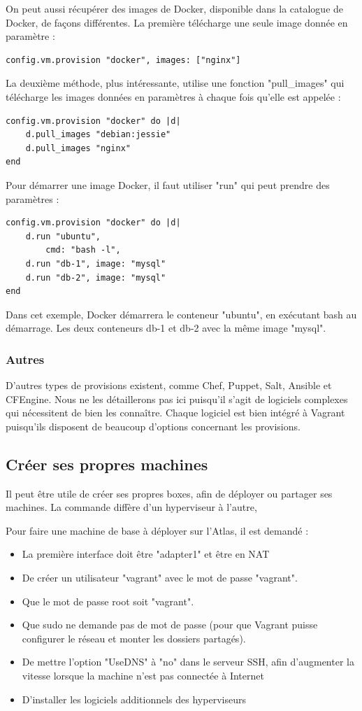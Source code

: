 \documentclass[12pt,a4paper]{article}
\begin{document}
On peut aussi récupérer des images de Docker, disponible dans la catalogue de Docker, de façons différentes. La première télécharge une seule image donnée en paramètre :
\begin{lstlisting}
config.vm.provision "docker", images: ["nginx"]
\end{lstlisting}
La deuxième méthode, plus intéressante, utilise une fonction "pull\_images" qui télécharge les images données en paramètres à chaque fois qu'elle est appelée : 
\begin{lstlisting}
config.vm.provision "docker" do |d|
	d.pull_images "debian:jessie"
	d.pull_images "nginx"
end
\end{lstlisting}

Pour démarrer une image Docker, il faut utiliser "run" qui peut prendre des paramètres :
\begin{lstlisting}
config.vm.provision "docker" do |d|
	d.run "ubuntu",
		cmd: "bash -l",
	d.run "db-1", image: "mysql"
	d.run "db-2", image: "mysql"
end
\end{lstlisting}
Dans cet exemple, Docker démarrera le conteneur "ubuntu", en exécutant bash au démarrage. Les deux conteneurs db-1 et db-2 avec la même image "mysql".

\subsubsection{Autres}

D'autres types de provisions existent, comme Chef, Puppet, Salt, Ansible et CFEngine. Nous ne les détaillerons pas ici puisqu'il s'agit de logiciels complexes qui nécessitent de bien les connaître. Chaque logiciel est bien intégré à Vagrant puisqu'ils disposent de beaucoup d'options concernant les provisions.

\subsection{Créer ses propres machines}
Il peut être utile de créer ses propres boxes, afin de déployer ou partager ses machines. La commande diffère d'un hyperviseur à l'autre, 

Pour faire une machine de base à déployer sur l'Atlas, il est demandé :
\begin{itemize}
	\item{La première interface doit être "adapter1" et être en NAT}
	\item{De créer un utilisateur "vagrant" avec le mot de passe "vagrant".}
	\item{Que le mot de passe root soit "vagrant".}
	\item{Que sudo ne demande pas de mot de passe (pour que Vagrant puisse configurer le réseau et monter les dossiers partagés).}
	\item{De mettre l'option "UseDNS" à "no" dans le serveur SSH, afin d'augmenter la vitesse lorsque la machine n'est pas connectée à Internet}
	\item{D'installer les logiciels additionnels des hyperviseurs}
\end{itemize}
\end{document}
